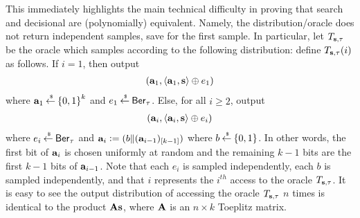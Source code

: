 This immediately highlights the main technical difficulty in proving that search and decisional \TLPN are (polynomially) equivalent.
Namely, the distribution/oracle does not return independent samples, save for the first sample.
In particular, let $T_{{\mathbf s}, \tau}$ be the oracle which samples according to the following distribution: define $T_{{\mathbf s}, \tau}(i)$ as follows.
If $i = 1$, then output
\begin{align*}
	(\ba_1, \ip{\ba_1}{\bs}\oplus e_1)
\end{align*}
where ${\mathbf a}_1 \mathbin{\stackrel{\mbox{\,\tiny \$}}{\gets}} {\{0,1\}}^k$ and $e_1 \mathbin{\stackrel{\mbox{\,\tiny \$}}{\gets}} \mathsf{Ber}_\tau$.
Else, for all $i \geq 2$, output
\begin{align*}
	(\ba_i, \ip{\ba_i}{\bs}\oplus e_i)
\end{align*}
where $e_i \mathbin{\stackrel{\mbox{\,\tiny \$}}{\gets}} \mathsf{Ber}_\tau$ and ${\mathbf a}_i {\;\vcentcolon=\;} (b\Vert({\mathbf a}_{i-1})_{[k-1]})$ where $b \mathbin{\stackrel{\mbox{\,\tiny \$}}{\gets}} {\{0,1\}}$.
In other words, the first bit of ${\mathbf a}_i$ is chosen uniformly at random and the remaining $k-1$ bits are the first $k-1$ bits of ${\mathbf a}_{i-1}$.
Note that each $e_i$ is sampled independently, each $b$ is sampled independently, and that $i$ represents the $i^{th}$ access to the oracle $T_{{\mathbf s},\tau}$.
It is easy to see the output distribution of accessing the oracle $T_{{\mathbf s},\tau}$ $n$ times is identical to the product ${\mathbf A}{\mathbf s}$, where ${\mathbf A}$ is an $n\times k$ Toeplitz matrix.


